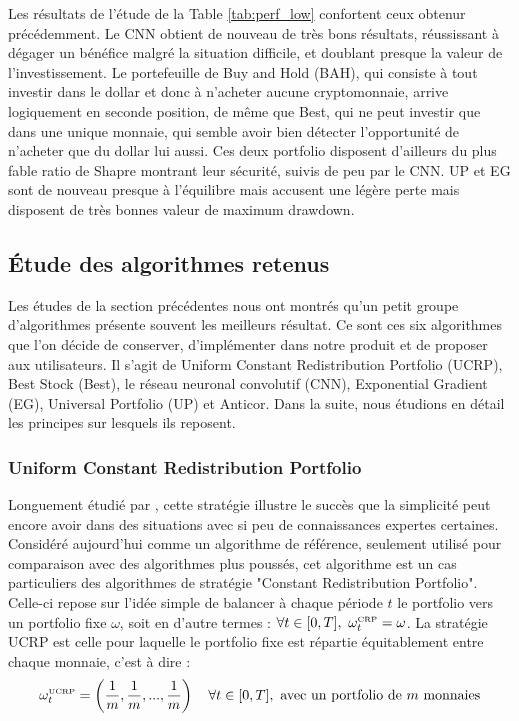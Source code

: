 \documentclass[a4paper, 10pt]{article}
\begin{document}
Les résultats de l'étude de la Table \ref{tab:perf_low} confortent ceux obtenur précédemment. Le CNN obtient de nouveau de très bons résultats, réussissant à dégager un bénéfice malgré la situation difficile, et doublant presque la valeur de l'investissement. Le portefeuille de Buy and Hold (BAH), qui consiste à tout investir dans le dollar et donc à n'acheter aucune cryptomonnaie, arrive logiquement en seconde position, de même que Best, qui ne peut investir que dans une unique monnaie, qui semble avoir bien détecter l'opportunité de n'acheter que du dollar lui aussi. Ces deux portfolio disposent d'ailleurs du plus fable ratio de Shapre montrant leur sécurité, suivis de peu par le CNN. UP et EG sont de nouveau presque à l'équilibre mais accusent une légère perte mais disposent de très bonnes valeur de maximum drawdown.

\subsection{Étude des algorithmes retenus}

Les études de la section précédentes nous ont montrés qu'un petit groupe d'algorithmes présente souvent les meilleurs résultat. Ce sont ces six algorithmes que l'on décide de conserver, d'implémenter dans notre produit et de proposer aux utilisateurs. Il s'agit de Uniform Constant Redistribution Portfolio (UCRP), Best Stock (Best), le réseau neuronal convolutif (CNN), Exponential Gradient (EG), Universal Portfolio (UP) et Anticor. Dans la suite, nous étudions en détail les principes sur lesquels ils reposent.

\subsubsection{Uniform Constant Redistribution Portfolio}

Longuement étudié par \citet{Cover1991}, cette stratégie illustre le succès que la simplicité peut encore avoir dans des situations avec si peu de connaissances expertes certaines. Considéré aujourd'hui comme un algorithme de référence, seulement utilisé pour comparaison avec des algorithmes plus poussés, cet algorithme est un cas particuliers des algorithmes de stratégie "Constant Redistribution Portfolio". Celle-ci repose sur l'idée simple de balancer à chaque période $t$ le portfolio vers un portfolio fixe $\omega$, soit en d'autre termes : $\forall t \in [0, T],\ \omega_t^{\text{\tiny CRP}} = \omega$. La stratégie UCRP est celle pour laquelle le portfolio fixe est répartie équitablement entre chaque monnaie, c'est à dire :
\begin{equation}
    \omega_t^{\text{\tiny UCRP}} = \left(\frac{1}{m}, \frac{1}{m}, ..., \frac{1}{m} \right) \quad \forall t \in [0, T], \text{ avec un portfolio de $m$ monnaies} 
\end{equation}
\end{document}

